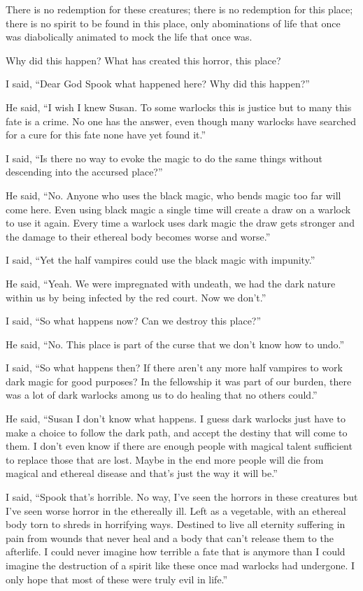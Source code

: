 There is no redemption for these creatures; there is no redemption for this place; there is no spirit to be found in this place, only abominations of life that once was diabolically animated to mock the life that once was.

Why did this happen? What has created this horror, this place?

I said, ``Dear God Spook what happened here? Why did this happen?''

He said, ``I wish I knew Susan. To some warlocks this is justice but to many this fate is a crime. No one has the answer, even though many warlocks have searched for a cure for this fate none have yet found it.''

I said, ``Is there no way to evoke the magic to do the same things without descending into the accursed place?''

He said, ``No. Anyone who uses the black magic, who bends magic too far will come here. Even using black magic a single time will create a draw on a warlock to use it again. Every time a warlock uses dark magic the draw gets stronger and the damage to their ethereal body becomes worse and worse.''

I said, ``Yet the half vampires could use the black magic with impunity.''

He said, ``Yeah. We were impregnated with undeath, we had the dark nature within us by being infected by the red court. Now we don't.''

I said, ``So what happens now? Can we destroy this place?''

He said, ``No. This place is part of the curse that we don't know how to undo.''

I said, ``So what happens then? If there aren't any more half vampires to work dark magic for good purposes? In the fellowship it was part of our burden, there was a lot of dark warlocks among us to do healing that no others could.''

He said, ``Susan I don't know what happens. I guess dark warlocks just have to make a choice to follow the dark path, and accept the destiny that will come to them. I don't even know if there are enough people with magical talent sufficient to replace those that are lost. Maybe in the end more people will die from magical and ethereal disease and that's just the way it will be.''

I said, ``Spook that's horrible. No way, I've seen the horrors in these creatures but I've seen worse horror in the ethereally ill. Left as a vegetable, with an ethereal body torn to shreds in horrifying ways. Destined to live all eternity suffering in pain from wounds that never heal and a body that can't release them to the afterlife. I could never imagine how terrible a fate that is anymore than I could imagine the destruction of a spirit like these once mad warlocks had undergone. I only hope that most of these were truly evil in life.''


